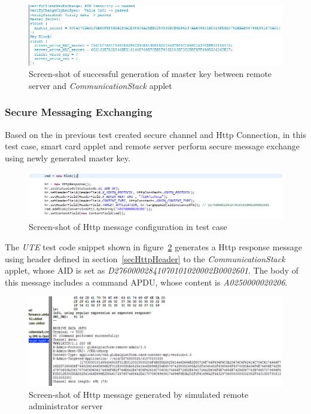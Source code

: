 \begin{figure}[!htb]
	\centering
	\includegraphics[width=1\textwidth]{Images/impl/master-key.png}
		\caption{Screen-shot of successful generation of master key between remote server and \emph{CommunicationStack} applet}
	\label{fig:mk}
\end{figure}


\subsubsection{Secure Messaging Exchanging}



Based on the in previous test created secure channel and Http Connection, in this test case, smart card applet and remote server perform secure message exchange using newly generated master key. 

\begin{figure}[!htb]
	\centering
	\includegraphics[width=1.2\textwidth]{q1.png}
		\caption{Screen-shot of Http message configuration in test case}
	\label{fig:q1}
\end{figure}

The \emph{UTE} test code snippet shown in figure~\ref{fig:q1} generates a Http response message using header defined in section~\ref{secHttpHeader} to the \emph{CommunicationStack} applet, whose AID is set as \emph{D27600002841070101020002B0002601}. The body of this message includes a command APDU, whose content is \emph{A0250000020206}.


\begin{figure}[!htb]
	\centering
	\includegraphics[width=1\textwidth]{q2.png}
		\caption{Screen-shot of Http message generated by simulated remote administrator server}
	\label{fig:q2}
\end{figure}

